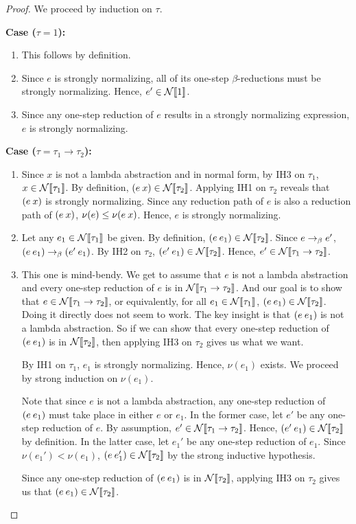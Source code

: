 \documentclass{article}
\theoremstyle{definition}
\begin{document}
\begin{proof}
  We proceed by induction on $\tau$.

  \textbf{Case ($\tau = 1$):}
  \begin{enumerate}
  \item This follows by definition.
  \item Since $e$ is strongly normalizing, all of its one-step $\beta$-reductions must be strongly normalizing.
    Hence, $e' \in \mathcal{N}\llbracket1\rrbracket$.
  \item Since any one-step reduction of $e$ results in a strongly normalizing expression, $e$ is strongly normalizing.
  \end{enumerate}

  \textbf{Case ($\tau = \tau_{1} \to \tau_{2}$):}
  \begin{enumerate}
  \item Since $x$ is not a lambda abstraction and in normal form, by IH3 on $\tau_{1}$, $x \in \mathcal{N}\llbracket\tau_{1}\rrbracket$.
    By definition, $(e\mkern4mux) \in \mathcal{N}\llbracket\tau_{2}\rrbracket$.
    Applying IH1 on $\tau_{2}$ reveals that $(e\mkern4mux)$ is strongly normalizing.
    Since any reduction path of $e$ is also a reduction path of $(e\mkern4mux)$, $\nu(e) \leq \nu(e\mkern4mux)$.
    Hence, $e$ is strongly normalizing.
  \item Let any $e_{1} \in \mathcal{N}\llbracket\tau_{1}\rrbracket$ be given.
    By definition, $(e\mkern4mue_{1}) \in \mathcal{N}\llbracket\tau_{2}\rrbracket$.
    Since $e\to_{\beta}e'$, $(e\mkern4mue_{1})\to_{\beta}(e'\mkern4mue_{1})$.
    By IH2 on $\tau_{2}$, $(e'\mkern4mue_{1}) \in \mathcal{N}\llbracket\tau_{2}\rrbracket$.
    Hence, $e' \in \mathcal{N}\llbracket\tau_{1} \to \tau_{2}\rrbracket$.
  \item This one is mind-bendy.
    We get to assume that $e$ is not a lambda abstraction and every one-step reduction of $e$ is in $\mathcal{N}\llbracket\tau_{1} \to \tau_{2}\rrbracket$.
    And our goal is to show that $e \in \mathcal{N}\llbracket\tau_{1} \to \tau_{2}\rrbracket$, or equivalently, for all $e_{1} \in \mathcal{N}\llbracket\tau_{1}\rrbracket$, $(e\mkern4mue_{1}) \in \mathcal{N}\llbracket\tau_{2}\rrbracket$.
    Doing it directly does not seem to work.
    The key insight is that $(e\mkern4mue_{1})$ is not a lambda abstraction.
    So if we can show that every one-step reduction of $(e\mkern4mue_{1})$ is in $\mathcal{N}\llbracket\tau_{2}\rrbracket$, then applying IH3 on $\tau_{2}$ gives us what we want.

    By IH1 on $\tau_{1}$, $e_{1}$ is strongly normalizing.
    Hence, $\nu(e_{1})$ exists.
    We proceed by strong induction on $\nu(e_{1})$.
    
    Note that since $e$ is not a lambda abstraction, any one-step reduction of $(e\mkern4mue_{1})$ must take place in either $e$ or $e_{1}$.
    In the former case, let $e'$ be any one-step reduction of $e$.
    By assumption, $e' \in \mathcal{N}\llbracket\tau_{1} \to \tau_{2}\rrbracket$.
    Hence, $(e'\mkern4mue_{1}) \in \mathcal{N}\llbracket\tau_{2}\rrbracket$ by definition.
    In the latter case, let $e_{1}'$ be any one-step reduction of $e_{1}$.
    Since $\nu(e_{1}') < \nu(e_{1})$, $(e\mkern4mue_{1}') \in \mathcal{N}\llbracket\tau_{2}\rrbracket$ by the strong inductive hypothesis.

    Since any one-step reduction of $(e\mkern4mue_{1})$ is in $\mathcal{N}\llbracket\tau_{2}\rrbracket$, applying IH3 on $\tau_{2}$ gives us that $(e\mkern4mue_{1}) \in \mathcal{N}\llbracket\tau_{2}\rrbracket$.
  \end{enumerate}
\end{proof}
\end{document}
